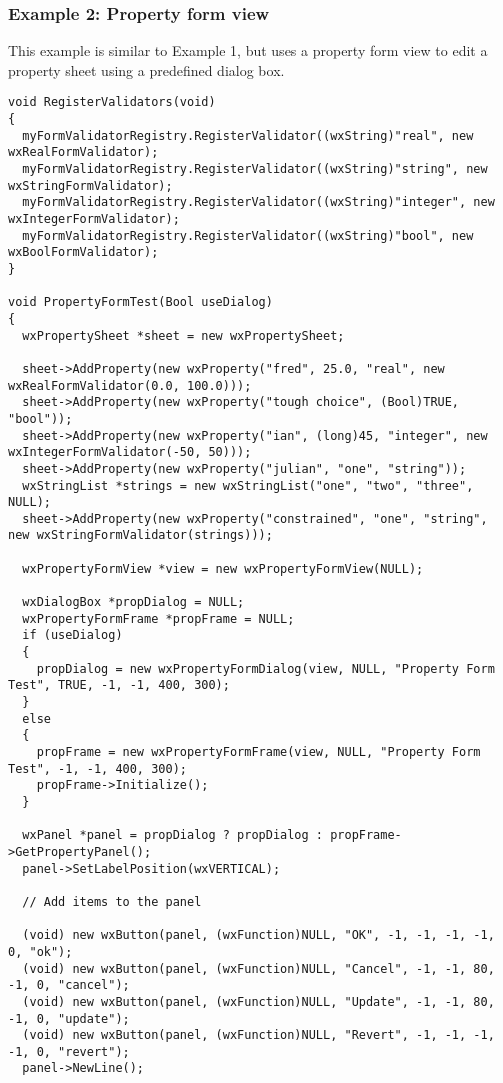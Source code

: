 \subsubsection{Example 2: Property form view}

This example is similar to Example 1, but uses a property form view to
edit a property sheet using a predefined dialog box.

\begin{verbatim}
void RegisterValidators(void)
{
  myFormValidatorRegistry.RegisterValidator((wxString)"real", new wxRealFormValidator);
  myFormValidatorRegistry.RegisterValidator((wxString)"string", new wxStringFormValidator);
  myFormValidatorRegistry.RegisterValidator((wxString)"integer", new wxIntegerFormValidator);
  myFormValidatorRegistry.RegisterValidator((wxString)"bool", new wxBoolFormValidator);
}

void PropertyFormTest(Bool useDialog)
{
  wxPropertySheet *sheet = new wxPropertySheet;

  sheet->AddProperty(new wxProperty("fred", 25.0, "real", new wxRealFormValidator(0.0, 100.0)));
  sheet->AddProperty(new wxProperty("tough choice", (Bool)TRUE, "bool"));
  sheet->AddProperty(new wxProperty("ian", (long)45, "integer", new wxIntegerFormValidator(-50, 50)));
  sheet->AddProperty(new wxProperty("julian", "one", "string"));
  wxStringList *strings = new wxStringList("one", "two", "three", NULL);
  sheet->AddProperty(new wxProperty("constrained", "one", "string", new wxStringFormValidator(strings)));

  wxPropertyFormView *view = new wxPropertyFormView(NULL);

  wxDialogBox *propDialog = NULL;
  wxPropertyFormFrame *propFrame = NULL;
  if (useDialog)
  {
    propDialog = new wxPropertyFormDialog(view, NULL, "Property Form Test", TRUE, -1, -1, 400, 300);
  }
  else
  {
    propFrame = new wxPropertyFormFrame(view, NULL, "Property Form Test", -1, -1, 400, 300);
    propFrame->Initialize();
  }
  
  wxPanel *panel = propDialog ? propDialog : propFrame->GetPropertyPanel();
  panel->SetLabelPosition(wxVERTICAL);
  
  // Add items to the panel
  
  (void) new wxButton(panel, (wxFunction)NULL, "OK", -1, -1, -1, -1, 0, "ok");
  (void) new wxButton(panel, (wxFunction)NULL, "Cancel", -1, -1, 80, -1, 0, "cancel");
  (void) new wxButton(panel, (wxFunction)NULL, "Update", -1, -1, 80, -1, 0, "update");
  (void) new wxButton(panel, (wxFunction)NULL, "Revert", -1, -1, -1, -1, 0, "revert");
  panel->NewLine();
  

\end{verbatim}
